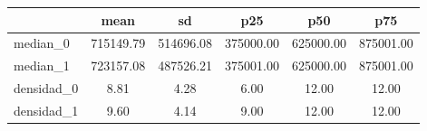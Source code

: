 {
\def\sym#1{\ifmmode^{#1}\else\(^{#1}\)\fi}
\begin{tabular}{l*{1}{ccccc}}
\toprule
                    &        mean&          sd&         p25&         p50&         p75\\
\midrule
median\_0            &   715149.79&   514696.08&   375000.00&   625000.00&   875001.00\\
median\_1            &   723157.08&   487526.21&   375001.00&   625000.00&   875001.00\\
densidad\_0          &        8.81&        4.28&        6.00&       12.00&       12.00\\
densidad\_1          &        9.60&        4.14&        9.00&       12.00&       12.00\\
\bottomrule
\end{tabular}
}
